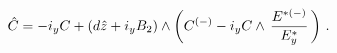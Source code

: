 \begin{equation}\label{rhC=r1}
\hat{C} = - i_y C + (d\hat{z}+ i_yB_2)\wedge 
\left(C^{(-)}- i_y C \wedge \,
 {{E}^{ {*}(-)}\over {E}_y^{ {*}}}\, \right)
\, .  
\end{equation}

